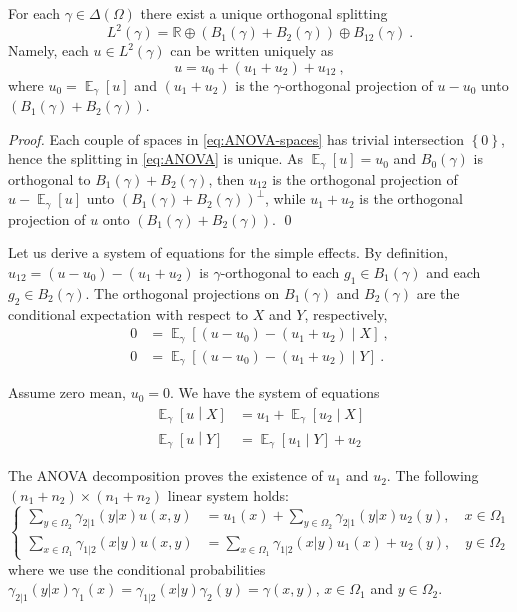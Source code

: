 \documentclass[runningheads]{llncs}
\DeclareMathOperator{\Expectation}{\mathbb E}
\newcommand{\condexpectat}[3]{{\Expectation}_{#1}\left[#2 \middle| #3\right]}
\newcommand{\expectat}[2]{{\Expectation}_{#1}\left[#2\right]}
\newcommand{\reals}{\mathbb R}
\newcommand{\set}[1]{\left\{ #1 \right\}}
\begin{document}
\begin{proposition}For each $\gamma \in \Delta(\Omega)$ there exist a unique orthogonal splitting
\begin{equation*}
L^2(\gamma) = \reals \oplus \left(B_1(\gamma) + B_2(\gamma)\right) \oplus B_{12}(\gamma) \ . 
\end{equation*}
Namely, each $u \in L^2(\gamma)$ can be written uniquely as
\begin{equation}
 \label{eq:ANOVA}
 u = u_0 + (u_1 + u_2) + u_{12} \ ,
\end{equation}
where $u_0=\expectat \gamma u$ and $(u_1+u_2)$ is the $\gamma$-orthogonal projection of $u-u_0$ unto
$(B_1(\gamma) + B_2(\gamma))$.
\end{proposition}

\begin{proof}Each couple of spaces in \cref{eq:ANOVA-spaces} has trivial intersection $\set{0}$, hence the splitting in \cref{eq:ANOVA} is unique. As $\expectat \gamma u = u_0$ and $B_0(\gamma)$ is orthogonal to $B_1(\gamma)+B_2(\gamma)$, then $u_{12}$ is the orthogonal projection of $u - \expectat \gamma u$ unto $(B_1(\gamma)+B_2(\gamma))^\perp$, while $u_1+u_2$ is the orthogonal projection of $u$ onto $(B_1(\gamma)+B_2(\gamma))$. \qed
\end{proof}

Let us derive a system of equations for the simple effects. By definition, $u_{12} = (u - u_0) - (u_1 + u_2)$ is $\gamma$-orthogonal to each $g_1 \in B_1(\gamma)$ and each $g_2 \in B_2(\gamma)$. The orthogonal projections on $B_1(\gamma)$ and $B_2(\gamma)$ are the conditional expectation with respect to $X$ and $Y$, respectively,
\begin{align*}
    0 &= \condexpectat \gamma {(u-u_0) - (u_1+u_2)}{X}  \ , \\
   0 &= \condexpectat \gamma {(u-u_0) - (u_1+u_2)}{Y} \ .
  \end{align*}

Assume zero mean, $u_0=0$. We have the system of equations
\begin{align*}
  \condexpectat \gamma u X &=  u_1 + \condexpectat \gamma {u_2} {X} \\
  \condexpectat \gamma u Y &= \condexpectat \gamma {u_1} {Y} + u_2
\end{align*}

The ANOVA decomposition proves the existence of $u_1$ and $u_2$.  The following $(n_1+n_2)\times(n_1+n_2)$ linear system holds:
\begin{equation*}
\begin{cases}
  \sum_{y \in \Omega_2} \gamma_{2|1}(y|x)u(x,y) &= u_1(x) + \sum_{y \in \Omega_2} \gamma_{2|1}(y|x) u_2(y) , \quad x \in \Omega_1 \\
  \sum_{x \in \Omega_1} \gamma_{1|2}(x|y)u(x,y) &= \sum_{x \in \Omega_1} \gamma_{1|2}(x|y) u_1(x)  + u_2(y) , \quad y \in \Omega_2
\end{cases}
\end{equation*}
where we use the conditional probabilities $\gamma_{2|1}(y|x) \gamma_1(x) = \gamma_{1|2}(x|y) \gamma_2(y) = \gamma(x,y)$, $x \in \Omega_1$ and $y \in \Omega_2$.
\end{document}
